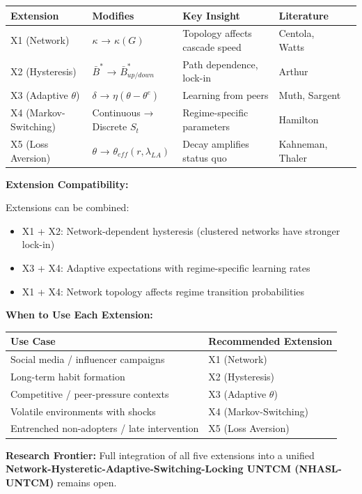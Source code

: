 \begin{tcolorbox}[colback=yellow!5!white, colframe=yellow!75!black,
    title=\textbf{UNTCM Theoretical Extensions: Summary}]

\begin{center}
\renewcommand{\arraystretch}{1.3}
\begin{tabular}{@{}lllll@{}}
\toprule
\textbf{Extension} & \textbf{Modifies} & \textbf{Key Insight} & \textbf{Literature} \\
\midrule
X1 (Network) & $\kappa$ → $\kappa(G)$ & Topology affects cascade speed & Centola, Watts \\
X2 (Hysteresis) & $\bar{B}^*$ → $\bar{B}^*_{up/down}$ & Path dependence, lock-in & Arthur \\
X3 (Adaptive $\theta$) & $\delta$ → $\eta(\theta - \theta^e)$ & Learning from peers & Muth, Sargent \\
X4 (Markov-Switching) & Continuous → Discrete $S_t$ & Regime-specific parameters & Hamilton \\
X5 (Loss Aversion) & $\theta$ → $\theta_{eff}(r, \lambda_{LA})$ & Decay amplifies status quo & Kahneman, Thaler \\
\bottomrule
\end{tabular}
\end{center}

\textbf{Extension Compatibility:}

Extensions can be combined:
\begin{itemize}[nosep]
\item X1 + X2: Network-dependent hysteresis (clustered networks have stronger lock-in)
\item X3 + X4: Adaptive expectations with regime-specific learning rates
\item X1 + X4: Network topology affects regime transition probabilities
\end{itemize}

\textbf{When to Use Each Extension:}

\begin{center}
\renewcommand{\arraystretch}{1.2}
\begin{tabular}{@{}ll@{}}
\toprule
\textbf{Use Case} & \textbf{Recommended Extension} \\
\midrule
Social media / influencer campaigns & X1 (Network) \\
Long-term habit formation & X2 (Hysteresis) \\
Competitive / peer-pressure contexts & X3 (Adaptive $\theta$) \\
Volatile environments with shocks & X4 (Markov-Switching) \\
Entrenched non-adopters / late intervention & X5 (Loss Aversion) \\
\bottomrule
\end{tabular}
\end{center}

\textbf{Research Frontier:} Full integration of all five extensions into a unified \textbf{Network-Hysteretic-Adaptive-Switching-Locking UNTCM (NHASL-UNTCM)} remains open.

\end{tcolorbox}

